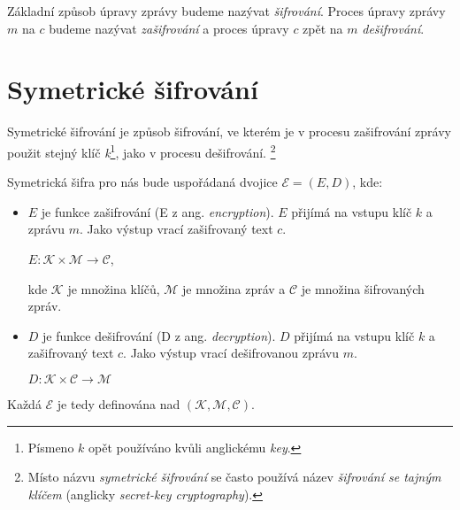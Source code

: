 \documentclass[
  program=infoi,
  biblatex,
  figures=false,
  glossaries,
  index
]{kidiplom}
\begin{document}
    Základní způsob úpravy zprávy budeme nazývat \emph{šifrování}. Proces úpravy zprávy $m$ na $c$
    budeme nazývat \emph{zašifrování} a proces úpravy $c$ zpět na $m$ \emph{dešifrování}.


\newpage


\part{Symetrické šifrování}\label{private-key}


    Symetrické šifrování je způsob šifrování, ve kterém je v procesu zašifrování zprávy použit
    stejný klíč \emph{k}\footnote{Písmeno $k$ opět používáno kvůli anglickému \emph{key}.}, jako v procesu dešifrování.
    \footnote{Místo názvu \emph{symetrické šifrování} se často používá
    název \emph{šifrování se tajným klíčem} (anglicky \emph{secret-key cryptography}).}


    \bigskip

    Symetrická šifra pro nás bude uspořádaná dvojice $\mathcal{E}  = (E, D)$, kde:

    \begin{itemize}
        \item
            $E$ je funkce zašifrování (E z ang. \emph{encryption}).
            $E$ přijímá na vstupu klíč $k$ a zprávu $m$.
            Jako výstup vrací zašifrovaný text $c$.

            \begin{center}
                $E: \mathcal{K} \times \mathcal{M} \rightarrow \mathcal{C}$,
            \end{center}

            kde $\mathcal{K}$ je množina klíčů, $\mathcal{M}$ je množina zpráv a 
            $\mathcal{C}$ je množina šifrovaných zpráv.

        \item
            $D$ je funkce dešifrování (D z ang. \emph{decryption}). $D$ přijímá na vstupu klíč $k$ a zašifrovaný text $c$.
            Jako výstup vrací dešifrovanou zprávu $m$.
            
            \begin{center}
                $D: \mathcal{K} \times \mathcal{C} \rightarrow \mathcal{M}$
            \end{center}

    \end{itemize}

    Každá $\mathcal{E}$ je tedy definována nad $(\mathcal{K},\mathcal{M},\mathcal{C})$.
\end{document}
